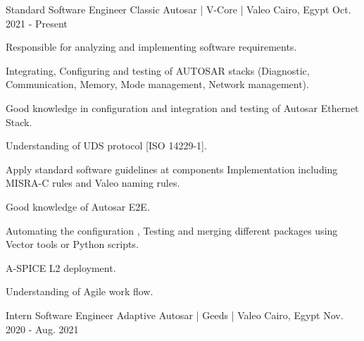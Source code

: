 

\begin{cventries}
  \cventry
    {\normalsize Standard Software Engineer} %
    {\Large Classic Autosar | V-Core | \color{green}Valeo} %
    {\normalsize Cairo, Egypt} %
    {\normalsize Oct. 2021 - Present} %
    {
      \begin{cvitems} %
        \item {\normalsize Responsible for analyzing and implementing software requirements.}
        \item {\normalsize Integrating, Configuring and testing of AUTOSAR stacks (Diagnostic, Communication, Memory, Mode management, Network management).}
        \item {\normalsize Good knowledge in configuration and integration and testing of Autosar Ethernet Stack.}
        \item {\normalsize Understanding of UDS protocol [ISO 14229-1].}
        \item {\normalsize Apply standard software guidelines at components Implementation including MISRA-C rules and Valeo naming rules.}
        \item {\normalsize Good knowledge of Autosar E2E.}
        \item {\normalsize Automating the configuration , Testing and merging different packages using Vector tools or Python scripts.}
        \item{\normalsize A-SPICE L2 deployment.}
        \item {\normalsize Understanding of Agile work flow.}
      \end{cvitems}
    }
  \cventry
    {\normalsize Intern Software Engineer} %
    {\newline \Large Adaptive Autosar | Geeds | \color{green}Valeo} %
    {\normalsize Cairo, Egypt} %
    {\normalsize Nov. 2020 - Aug. 2021} %
    {
      \begin{cvitems} %

\end{cvitems}}
\end{cventries}
